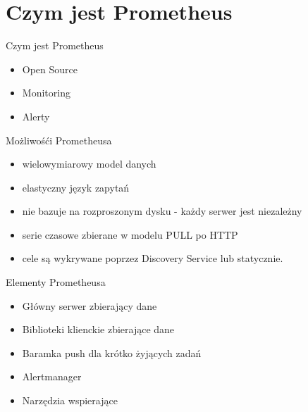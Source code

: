 \documentclass[epic,eepic,aspectratio=169,12pt]{beamer}
\begin{document}
\section{Czym jest Prometheus}
\begin{frame}{Czym jest Prometheus}
	\begin{itemize}
		\item Open Source %
		\item Monitoring %
		\item Alerty
	\end{itemize}
\end{frame}
\begin{frame}{Możliwośći Prometheusa}
	\begin{itemize}
		\item  wielowymiarowy model danych
		\item  elastyczny język zapytań
		\item nie bazuje na rozproszonym dysku - każdy serwer jest niezależny
		\item serie czasowe zbierane w modelu PULL po HTTP
		\item cele są wykrywane poprzez Discovery Service lub statycznie.
	\end{itemize}
\end{frame}
\begin{frame}{Elementy Prometheusa}
	\begin{itemize}
		\item Główny serwer zbierający dane
		\item Biblioteki klienckie zbierające dane
		\item Baramka push dla krótko żyjących zadań
		\item Alertmanager
		\item Narzędzia wspierające
	\end{itemize}
\end{frame}
\end{document}
